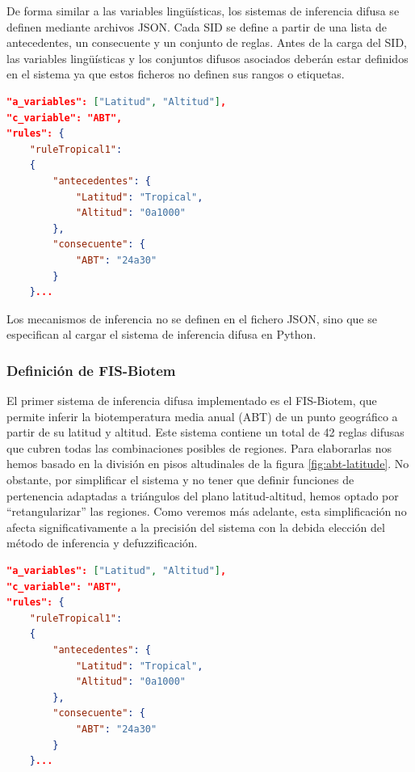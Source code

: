 \documentclass[11pt,a4paper]{article}
\begin{document}
De forma similar a las variables lingüísticas, los sistemas de inferencia difusa se definen mediante archivos JSON. 
Cada SID se define a partir de una lista de antecedentes, un consecuente y un conjunto de reglas. Antes de la carga del SID, las
variables lingüísticas y los conjuntos difusos asociados deberán estar definidos en el sistema ya que estos ficheros
no definen sus rangos o etiquetas. 

\begin{lstlisting}[language=JSON, caption={Definición de un sistema de inferencia difusa}, label={lst:json-fis}]
"a_variables": ["Latitud", "Altitud"],
"c_variable": "ABT",
"rules": {
    "ruleTropical1":
    {
        "antecedentes": {
            "Latitud": "Tropical",
            "Altitud": "0a1000"
        },
        "consecuente": {
            "ABT": "24a30"
        }
    }...
\end{lstlisting}

Los mecanismos de inferencia no se definen en el fichero JSON, sino que se especifican al cargar el sistema de inferencia difusa en Python.

\subsubsection{Definición de FIS-Biotem}

El primer sistema de inferencia difusa implementado es el FIS-Biotem, que permite inferir la biotemperatura media anual (ABT)
de un punto geográfico a partir de su latitud y altitud. Este sistema contiene un total de 42 reglas difusas que cubren 
todas las combinaciones posibles de regiones. Para elaborarlas nos hemos basado en la división en pisos altudinales de la 
figura \ref{fig:abt-latitude}. No obstante, por simplificar el sistema y no tener que definir funciones de pertenencia
adaptadas a triángulos del plano latitud-altitud, hemos optado por ``retangularizar'' las regiones. Como veremos más adelante,
esta simplificación no afecta significativamente a la precisión del sistema con la debida elección del método de inferencia y defuzzificación.


\begin{lstlisting}[language=JSON, caption={Definición del sistema de inferencia difusa FIS-Biotem}, label={lst:json-fis}]
"a_variables": ["Latitud", "Altitud"],
"c_variable": "ABT",
"rules": {
    "ruleTropical1":
    {
        "antecedentes": {
            "Latitud": "Tropical",
            "Altitud": "0a1000"
        },
        "consecuente": {
            "ABT": "24a30"
        }
    }...
\end{lstlisting}
\end{document}

